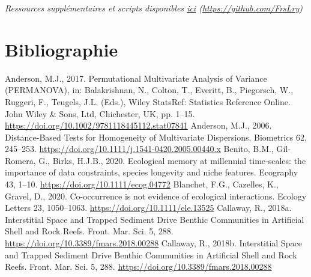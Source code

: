 \documentclass[12pt]{report}
\begin{document}
\textit{
Ressources supplémentaires et scripts disponibles \href{https://github.com/FrsLry/Projet_Ifremer}{ici}
(\href{https://github.com/FrsLry/Projet_Ifremer}{https://github.com/FrsLry})
}


\endgroup %

\chapter{Bibliographie}

\begin{singlespacing}

Anderson, M.J., 2017. Permutational Multivariate Analysis of Variance (PERMANOVA), in: Balakrishnan, N., Colton, T., Everitt, B., Piegorsch, W., Ruggeri, F., Teugels, J.L. (Eds.), Wiley StatsRef: Statistics Reference Online. John Wiley & Sons, Ltd, Chichester, UK, pp. 1–15.\newline 
\href{https://doi.org/10.1002/9781118445112.stat07841}{https://doi.org/10.1002/9781118445112.stat07841}
\newline \newline
Anderson, M.J., 2006. Distance-Based Tests for Homogeneity of Multivariate Dispersions. Biometrics 62, 245–253. \href{https://doi.org/10.1111/j.1541-0420.2005.00440.x}{https://doi.org/10.1111/j.1541-0420.2005.00440.x}
\newline\newline
Benito, B.M., Gil‐Romera, G., Birks, H.J.B., 2020. Ecological memory at millennial time‐scales: the importance of data constraints, species longevity and niche features. Ecography 43, 1–10. \href{https://doi.org/10.1111/ecog.04772}{https://doi.org/10.1111/ecog.04772}
\newline\newline
Blanchet, F.G., Cazelles, K., Gravel, D., 2020. Co-occurrence is not evidence of ecological interactions. Ecology Letters 23, 1050–1063. \href{https://doi.org/10.1111/ele.13525}{https://doi.org/10.1111/ele.13525}
\newline\newline
Callaway, R., 2018a. Interstitial Space and Trapped Sediment Drive Benthic Communities in Artificial Shell and Rock Reefs. Front. Mar. Sci. 5, 288. \href{https://doi.org/10.3389/fmars.2018.00288}{https://doi.org/10.3389/fmars.2018.00288}
\newline\newline
Callaway, R., 2018b. Interstitial Space and Trapped Sediment Drive Benthic Communities in Artificial Shell and Rock Reefs. Front. Mar. Sci. 5, 288. \href{https://doi.org/10.3389/fmars.2018.00288}{https://doi.org/10.3389/fmars.2018.00288}

\end{singlespacing}
\end{document}
